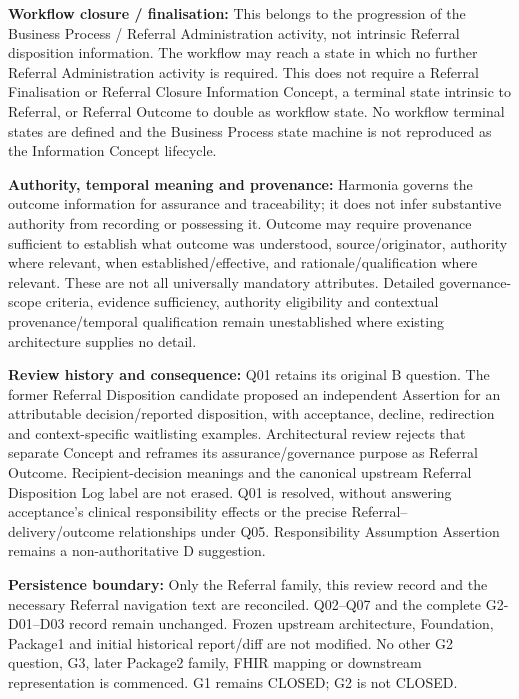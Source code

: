 \textbf{Workflow closure / finalisation:} This belongs to the progression of the Business Process / Referral Administration activity, not intrinsic Referral disposition information. The workflow may reach a state in which no further Referral Administration activity is required. This does not require a Referral Finalisation or Referral Closure Information Concept, a terminal state intrinsic to Referral, or Referral Outcome to double as workflow state. No workflow terminal states are defined and the Business Process state machine is not reproduced as the Information Concept lifecycle.



\textbf{Authority, temporal meaning and provenance:} Harmonia governs the outcome information for assurance and traceability; it does not infer substantive authority from recording or possessing it. Outcome may require provenance sufficient to establish what outcome was understood, source/originator, authority where relevant, when established/effective, and rationale/qualification where relevant. These are not all universally mandatory attributes. Detailed governance-scope criteria, evidence sufficiency, authority eligibility and contextual provenance/temporal qualification remain unestablished where existing architecture supplies no detail.



\textbf{Review history and consequence:} Q01 retains its original B question. The former Referral Disposition candidate proposed an independent Assertion for an attributable decision/reported disposition, with acceptance, decline, redirection and context-specific waitlisting examples. Architectural review rejects that separate Concept and reframes its assurance/governance purpose as Referral Outcome. Recipient-decision meanings and the canonical upstream Referral Disposition Log label are not erased. Q01 is resolved, without answering acceptance's clinical responsibility effects or the precise Referral–delivery/outcome relationships under Q05. Responsibility Assumption Assertion remains a non-authoritative D suggestion.



\textbf{Persistence boundary:} Only the Referral family, this review record and the necessary Referral navigation text are reconciled. Q02–Q07 and the complete G2-D01–D03 record remain unchanged. Frozen upstream architecture, Foundation, Package1 and initial historical report/diff are not modified. No other G2 question, G3, later Package2 family, FHIR mapping or downstream representation is commenced. G1 remains CLOSED; G2 is not CLOSED.



